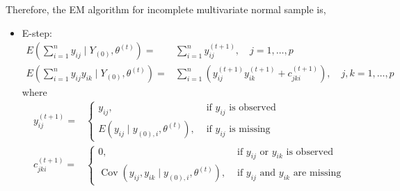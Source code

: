 \begin{example}
	Therefore, the EM algorithm for incomplete multivariate normal sample is,
	\begin{itemize}
		\item E-step:
		      \begin{equation}
			      \begin{aligned}
				      E\left(\sum_{i=1}^{n} y_{i j} \mid Y_{(0)}, \theta^{(t)}\right)=         & \sum_{i=1}^{n} y_{i j}^{(t+1)}, \quad j=1, \ldots, p                                                  \\
				      E\left(\sum_{i=1}^{n} y_{i j} y_{i k} \mid Y_{(0)}, \theta^{(t)}\right)= & \sum_{i=1}^{n}\left(y_{i j}^{(t+1)} y_{i k}^{(t+1)}+c_{j k i}^{(t+1)}\right), \quad j, k=1, \ldots, p
			      \end{aligned}
		      \end{equation}
		      where
		      \begin{equation}
			      \begin{aligned}
				      y_{i j}^{(t+1)}=   & \left\{\begin{array}{ll}
					                                  y_{i j},                                             & \text { if } y_{i j} \text { is observed} \\
					                                  E\left(y_{i j} \mid y_{(0), i}, \theta^{(t)}\right), & \text { if } y_{i j} \text { is missing}
				                                  \end{array}\right.                                                                          \\
				      c_{j k i}^{(t+1)}= & \left\{\begin{array}{ll}
					                                  0,                                                                             & \text { if } y_{i j} \text { or } y_{i k} \text { is observed}  \\
					                                  \operatorname{Cov}\left(y_{i j}, y_{i k} \mid y_{(0), i}, \theta^{(t)}\right), & \text { if } y_{i j} \text { and } y_{i k} \text { are missing}
				                                  \end{array}\right.
			      \end{aligned}
		      \end{equation}


\end{itemize}
\end{example}
